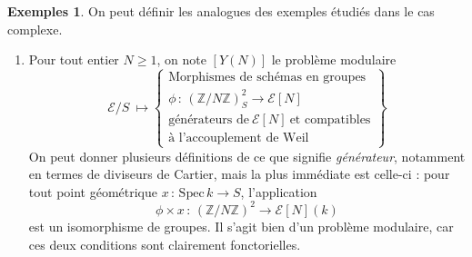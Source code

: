 \documentclass[11pt,a4paper]{article}
\newcommand{\Z}{\mathbb{Z}}
\newcommand{\E}{\mathcal{E}}
\newcommand{\vers}{\longrightarrow}
\newcommand{\Spec}{\mathrm{Spec}\,}
\newcommand{\de}{\,:\,}
\theoremstyle{definition}
\newtheorem*{ex}{Exemples}
\begin{document}
\begin{ex} On peut définir les analogues des exemples étudiés dans le cas complexe.
\begin{enumerate}
\item Pour tout entier $N\geq 1$, on note $[Y(N)]$ le problème modulaire
$$ \E/S\ \longmapsto \left\{
\begin{matrix}
\text{Morphismes\ de\ schémas\ en\ groupes}\\
\phi\de (\Z/N\Z)^2_S\vers \E[N]\ \\
\text{générateurs\ de}\ \E[N]\ \text{et\ compatibles}\\
 \text{à\ l'accouplement\ de\ Weil}
\end{matrix}
\right\}$$
On peut donner plusieurs définitions de ce que signifie \emph{générateur}, notamment en termes de diviseurs de Cartier, mais la plus immédiate est celle-ci : pour tout point géométrique $x\de\Spec k\vers S$, l'application
$$\phi \times x\de (\Z/N\Z)^2 \vers \E[N](k)$$
est un isomorphisme de groupes. Il s'agit bien d'un problème modulaire, car ces deux conditions sont clairement fonctorielles.


\end{enumerate}
\end{ex}
\end{document}
